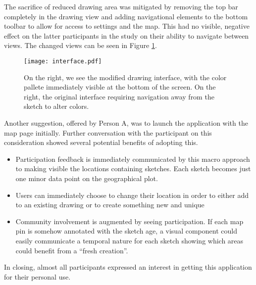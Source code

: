 \documentclass{www2010-submission}
\begin{document}
The sacrifice of reduced drawing area was mitigated by removing the top bar
completely in the drawing view and adding navigational elements to the bottom
toolbar to allow for access to settings and the map.  This had no visible,
negative effect on the latter participants in the study on their ability to
navigate between views.  The changed views can be seen in Figure \ref{fig:chg}.

\begin{figure}
\centering
\texttt{[image: interface.pdf]}
\caption{On the right, we see the modified drawing interface, with the color
pallete immediately visible at the bottom of the screen.  On the right, the
original interface requiring navigation away from the sketch to alter colors.}
\label{fig:chg}
\end{figure}

Another suggestion, offered by Person A, was to launch the application with the
map page initially.  Further conversation with the participant on this
consideration showed several potential benefits of adopting this.
\begin{itemize}
\item Participation feedback is immediately communicated by this macro approach
to making visible the locations containing sketches.  Each sketch becomes just
one minor data point on the geographical plot.
\item Users can immediately choose to change their location in order to either
add to an existing drawing or to create something new and unique
\item Community involvement is augmented by seeing participation.  If each map
pin is somehow annotated with the sketch age, a visual component could easily
communicate a temporal nature for each sketch showing which areas could benefit
from a ``fresh creation''.
\end{itemize}

In closing, almost all participants expressed an interest in getting this
application for their personal use.  
\end{document}
